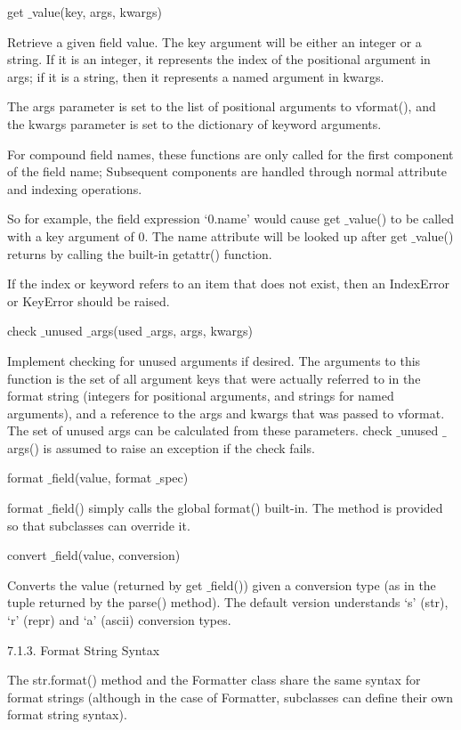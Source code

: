 get $  \_  $value(key, args, kwargs) \par
Retrieve a given field value. The key argument will be either an integer or a string. If it is an integer, it represents the index of the positional argument in args; if it is a string, then it represents a named argument in kwargs. \par
The args parameter is set to the list of positional arguments to vformat(), and the kwargs parameter is set to the dictionary of keyword arguments. \par
For compound field names, these functions are only called for the first component of the field name; Subsequent components are handled through normal attribute and indexing operations. \par
So for example, the field expression ‘0.name’ would cause get $  \_  $value() to be called with a key argument of 0. The name attribute will be looked up after get $  \_  $value() returns by calling the built-in getattr() function. \par
If the index or keyword refers to an item that does not exist, then an IndexError or KeyError should be raised. \par
check $  \_  $unused $  \_  $args(used $  \_  $args, args, kwargs) \par
Implement checking for unused arguments if desired. The arguments to this function is the set of all argument keys that were actually referred to in the format string (integers for positional arguments, and strings for named arguments), and a reference to the args and kwargs that was passed to vformat. The set of unused args can be calculated from these parameters. check $  \_  $unused $  \_  $args() is assumed to raise an exception if the check fails. \par
format $  \_  $field(value, format $  \_  $spec) \par
format $  \_  $field() simply calls the global format() built-in. The method is provided so that subclasses can override it. \par
convert $  \_  $field(value, conversion) \par
Converts the value (returned by get $  \_  $field()) given a conversion type (as in the tuple returned by the parse() method). The default version understands ‘s’ (str), ‘r’ (repr) and ‘a’ (ascii) conversion types. \par
7.1.3. Format String Syntax \par
The str.format() method and the Formatter class share the same syntax for format strings (although in the case of Formatter, subclasses can define their own format string syntax). \par

